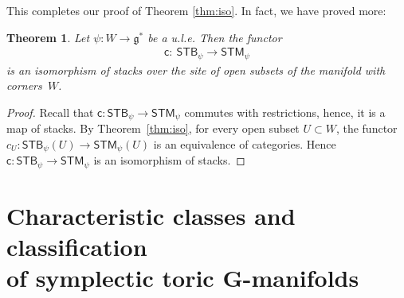 \documentclass[10pt,a4paper]{amsart}
\numberwithin{equation}{section}
\newtheorem{Theorem}[Lemma]{Theorem}
\begin{document}
This completes our proof of Theorem \ref{thm:iso}.  In fact, we have
proved more:


\begin{Theorem} Let $\psi\colon W\to {\mathfrak g}^*$ be a u.l.e.
Then the functor
\begin{gather*}
{\textsf{c}} \colon \ {\textsf{STB}}_\psi \to {\textsf{STM}}_\psi
\end{gather*}
is an isomorphism of stacks over the site of open subsets of the
manifold with corners~$W$.
\end{Theorem}

\begin{proof}
Recall that
${\textsf{c}} \colon {\textsf{STB}}_\psi \to {\textsf{STM}}_\psi$ commutes with restrictions,
hence, it is a map of stacks.
By Theorem~\ref{thm:iso}, for every open subset $U \subset W$,
the functor $ c_U\colon  {\textsf{STB}}_\psi(U)\to {\textsf{STM}}_\psi (U) $
is an equivalence of categories.  Hence
${\textsf{c}} \colon {\textsf{STB}}_\psi \to {\textsf{STM}}_\psi$ is an isomorphism of stacks.
\end{proof}

\section[Characteristic classes and classif\/ication
of symplectic toric $G$-manifolds]{Characteristic classes and classif\/ication\\
of symplectic toric $\boldsymbol{G}$-manifolds}
\label{sec:invariants}
\end{document}
